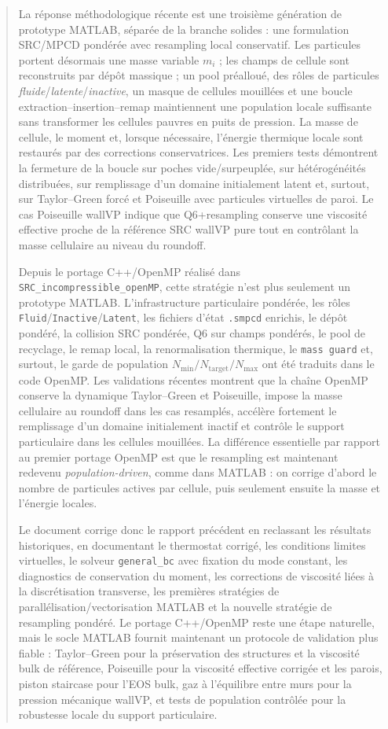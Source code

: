 \documentclass[11pt,a4paper]{article}
\begin{document}
\begin{abstract}
La réponse méthodologique récente est une troisième génération de prototype MATLAB, séparée de la branche solides : une formulation SRC/MPCD pondérée avec resampling local conservatif. Les particules portent désormais une masse variable $m_i$ ; les champs de cellule sont reconstruits par dépôt massique ; un pool préalloué, des rôles de particules \emph{fluide}/\emph{latente}/\emph{inactive}, un masque de cellules mouillées et une boucle extraction--insertion--remap maintiennent une population locale suffisante sans transformer les cellules pauvres en puits de pression. La masse de cellule, le moment et, lorsque nécessaire, l'énergie thermique locale sont restaurés par des corrections conservatrices. Les premiers tests démontrent la fermeture de la boucle sur poches vide/surpeuplée, sur hétérogénéités distribuées, sur remplissage d'un domaine initialement latent et, surtout, sur Taylor--Green forcé et Poiseuille avec particules virtuelles de paroi. Le cas Poiseuille wallVP indique que Q6+resampling conserve une viscosité effective proche de la référence SRC wallVP pure tout en contrôlant la masse cellulaire au niveau du roundoff.


Depuis le portage C++/OpenMP réalisé dans \texttt{SRC\_incompressible\_openMP}, cette stratégie n'est plus seulement un prototype MATLAB. L'infrastructure particulaire pondérée, les rôles \texttt{Fluid}/\texttt{Inactive}/\texttt{Latent}, les fichiers d'état \texttt{.smpcd} enrichis, le dépôt pondéré, la collision SRC pondérée, Q6 sur champs pondérés, le pool de recyclage, le remap local, la renormalisation thermique, le \texttt{mass guard} et, surtout, le garde de population $N_{\min}/N_{\mathrm{target}}/N_{\max}$ ont été traduits dans le code OpenMP. Les validations récentes montrent que la chaîne OpenMP conserve la dynamique Taylor--Green et Poiseuille, impose la masse cellulaire au roundoff dans les cas resamplés, accélère fortement le remplissage d'un domaine initialement inactif et contrôle le support particulaire dans les cellules mouillées. La différence essentielle par rapport au premier portage OpenMP est que le resampling est maintenant redevenu \emph{population-driven}, comme dans MATLAB : on corrige d'abord le nombre de particules actives par cellule, puis seulement ensuite la masse et l'énergie locales.

Le document corrige donc le rapport précédent en reclassant les résultats historiques, en documentant le thermostat corrigé, les conditions limites virtuelles, le solveur \texttt{general\_bc} avec fixation du mode constant, les diagnostics de conservation du moment, les corrections de viscosité liées à la discrétisation transverse, les premières stratégies de parallélisation/vectorisation MATLAB et la nouvelle stratégie de resampling pondéré. Le portage C++/OpenMP reste une étape naturelle, mais le socle MATLAB fournit maintenant un protocole de validation plus fiable : Taylor--Green pour la préservation des structures et la viscosité bulk de référence, Poiseuille pour la viscosité effective corrigée et les parois, piston staircase pour l'EOS bulk, gaz à l'équilibre entre murs pour la pression mécanique wallVP, et tests de population contrôlée pour la robustesse locale du support particulaire.



\end{abstract}
\end{document}
